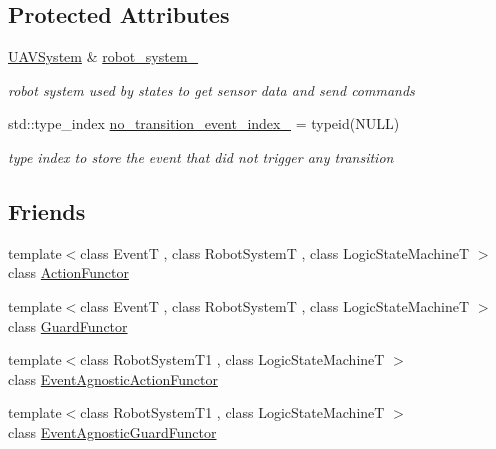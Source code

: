\subsection*{Protected Attributes}
\begin{DoxyCompactItemize}
\item 
\hyperlink{classUAVSystem}{U\-A\-V\-System} \& \hyperlink{classLogicStateMachineFrontEnd_a8431e5208e24b80105d639281361a252}{robot\-\_\-system\-\_\-}
\begin{DoxyCompactList}\small\item\em robot system used by states to get sensor data and send commands \end{DoxyCompactList}\item 
std\-::type\-\_\-index \hyperlink{classLogicStateMachineFrontEnd_a0f19247a261344e58dede909f598677f}{no\-\_\-transition\-\_\-event\-\_\-index\-\_\-} = typeid(N\-U\-L\-L)
\begin{DoxyCompactList}\small\item\em type index to store the event that did not trigger any transition \end{DoxyCompactList}\end{DoxyCompactItemize}
\subsection*{Friends}
\begin{DoxyCompactItemize}
\item 
{\footnotesize template$<$class Event\-T , class Robot\-System\-T , class Logic\-State\-Machine\-T $>$ }\\class \hyperlink{classLogicStateMachineFrontEnd_a05673eb4ec343f36c1f3fb787ac26b94}{Action\-Functor}
\item 
{\footnotesize template$<$class Event\-T , class Robot\-System\-T , class Logic\-State\-Machine\-T $>$ }\\class \hyperlink{classLogicStateMachineFrontEnd_a9411581bb37b54467df520e3c73ceaf0}{Guard\-Functor}
\item 
{\footnotesize template$<$class Robot\-System\-T1 , class Logic\-State\-Machine\-T $>$ }\\class \hyperlink{classLogicStateMachineFrontEnd_a86a665e36420c3cbc2b45864e023f98a}{Event\-Agnostic\-Action\-Functor}
\item 
{\footnotesize template$<$class Robot\-System\-T1 , class Logic\-State\-Machine\-T $>$ }\\class \hyperlink{classLogicStateMachineFrontEnd_af372c36475bc4510af791f5cb66608ad}{Event\-Agnostic\-Guard\-Functor}
\end{DoxyCompactItemize}


